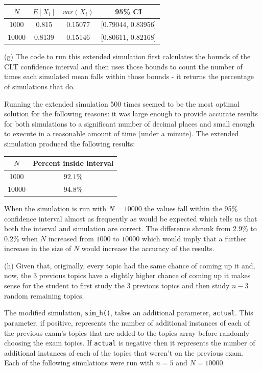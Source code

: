 \documentclass[10pt]{article}
\begin{document}
\begin{center}
    \begin{tabular}{|c|c|c|c|}
        \hline
        $N$ & $E[X_i]$ & $var(X_i)$ & 95\% CI \\ \hline
        1000 & 0.815 & 0.15077 & [0.79044, 0.83956] \\ \hline
        10000 & 0.8139 & 0.15146 & [0.80611, 0.82168] \\ \hline
    \end{tabular}
\end{center}

\noindent (g) The code to run this extended simulation first calculates the bounds of the CLT confidence interval and then uses those bounds to count the number of times each simulated mean falls within those bounds - it returns the percentage of simulations that do.

Running the extended simulation 500 times seemed to be the most optimal solution for the following reasons: it was large enough to provide accurate results for both simulations to a significant number of decimal places and small enough to execute in a reasonable amount of time (under a minute). The extended simulation produced the following results:

\begin{center}
    \begin{tabular}{|c|c|}
        \hline
        $N$ & Percent inside interval \\ \hline
        1000 & $92.1\%$ \\ \hline
        10000 & $94.8\%$ \\ \hline
    \end{tabular}
\end{center}

When the simulation is run with $N = 10000$ the values fall within the 95\% confidence interval almost as frequently as would be expected which tells us that both the interval and simulation are correct. The difference shrunk from 2.9\% to 0.2\% when $N$ increased from $1000$ to $10000$ which would imply that a further increase in the size of $N$ would increase the accuracy of the results.

\noindent (h) Given that, originally, every topic had the same chance of coming up it and, now, the 3 previous topics have a slightly higher chance of coming up it makes sense for the student to first study the 3 previous topics and then study $n - 3$ random remaining topics.

The modified simulation, \texttt{sim\_h()}, takes an additional parameter, \texttt{actual}. This parameter, if positive, represents the number of additional instances of each of the previous exam's topics that are added to the topics array before randomly choosing the exam topics. If \texttt{actual} is negative then it represents the number of additional instances of each of the topics that weren't on the previous exam. Each of the following simulations were run with $n = 5$ and $N = 10000$.
\end{document}

